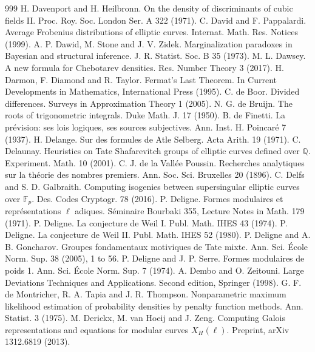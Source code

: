 \begin{thebibliography}{999}
 H. Davenport and H. Heilbronn. On the density of discriminants of cubic fields II. Proc. Roy. Soc. London Ser. A 322 (1971).
 C. David and F. Pappalardi. Average Frobenius distributions of elliptic curves. Internat. Math. Res. Notices (1999).
 A. P. Dawid, M. Stone and J. V. Zidek. Marginalization paradoxes in Bayesian and structural inference. J. R. Statist. Soc. B 35 (1973).
 M. L. Dawsey. A new formula for Chebotarev densities. Res. Number Theory 3 (2017).
 H. Darmon, F. Diamond and R. Taylor. Fermat's Last Theorem. In Current Developments in Mathematics, International Press (1995).
 C. de Boor. Divided differences. Surveys in Approximation Theory 1 (2005).
 N. G. de Bruijn. The roots of trigonometric integrals. Duke Math. J. 17 (1950).
 B. de Finetti. La pr\'evision: ses lois logiques, ses sources subjectives. Ann. Inst. H. Poincar\'e 7 (1937).
 H. Delange. Sur des formules de Atle Selberg. Acta Arith. 19 (1971).
 C. Delaunay. Heuristics on Tate Shafarevitch groups of elliptic curves defined over $\mathbb{Q}$. Experiment. Math. 10 (2001).
 C. J. de la Vall\'ee Poussin. Recherches analytiques sur la th\'eorie des nombres premiers. Ann. Soc. Sci. Bruxelles 20 (1896).
 C. Delfs and S. D. Galbraith. Computing isogenies between supersingular elliptic curves over $\mathbb{F}_p$. Des. Codes Cryptogr. 78 (2016).
 P. Deligne. Formes modulaires et repr\'esentations $\ell$ adiques. S\'eminaire Bourbaki 355, Lecture Notes in Math. 179 (1971).
 P. Deligne. La conjecture de Weil I. Publ. Math. IHES 43 (1974).
 P. Deligne. La conjecture de Weil II. Publ. Math. IHES 52 (1980).
 P. Deligne and A. B. Goncharov. Groupes fondamentaux motiviques de Tate mixte. Ann. Sci. \'Ecole Norm. Sup. 38 (2005), 1 to 56.
 P. Deligne and J. P. Serre. Formes modulaires de poids 1. Ann. Sci. \'Ecole Norm. Sup. 7 (1974).
 A. Dembo and O. Zeitouni. Large Deviations Techniques and Applications. Second edition, Springer (1998).
 G. F. de Montricher, R. A. Tapia and J. R. Thompson. Nonparametric maximum likelihood estimation of probability densities by penalty function methods. Ann. Statist. 3 (1975).
 M. Derickx, M. van Hoeij and J. Zeng. Computing Galois representations and equations for modular curves $X_H(\ell)$. Preprint, arXiv 1312.6819 (2013).

\end{thebibliography}
